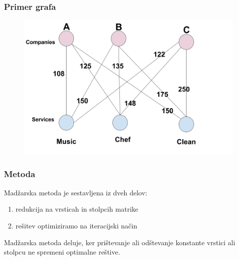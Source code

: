 \documentclass{beamer}
\begin{document}
\begin{frame}
\frametitle{Primer grafa}
    \begin{figure}[htbp]
        \centerline{\includegraphics[scale=0.25]{bipartite_graph.png}}
    \end{figure}  
\end{frame}

\begin{frame}
\frametitle{Metoda}
    \begin{block}{} 
        Madžarska metoda je sestavljena iz dveh delov:
        \begin{enumerate}
            \item redukcija na vrsticah in stolpcih matrike
            \item rešitev optimiziramo na
            iteracijski način
        \end{enumerate}
    \end{block}
    \begin{block}{} 
        Madžarska metoda deluje, ker prištevanje ali odštevanje konstante vrstici
        ali stolpcu ne spremeni optimalne reštive.
    \end{block}
\end{frame}
\end{document}
